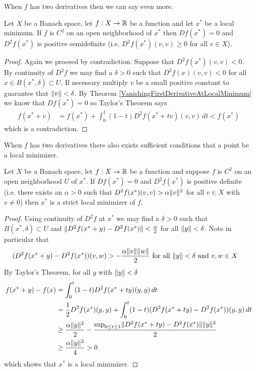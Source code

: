 When $f$ has two derivatives then we can say even more.
\begin{thm}\label{PositiveSemidefiniteSecondDerivativeAtLocalMinimum}Let $X$ be a
  Banach space, let $f : X \to \mathbb{R}$ be a function and let $x^*$ be
  a local minimum.  If $f$ is $C^2$ on an open neighborhood of $x^*$
  then $Df(x^*) = 0$ and $D^2f(x^*)$ is positive semidefinite
  (i.e. $D^2f(x^*) (v,v) \geq 0$ for all $v \in X$).
\end{thm}
\begin{proof}
Again we proceed by contradiction.  Suppose that $D^2f(x^*)(v,v) < 0$.
By continuity of $D^2f$ we may find a $\delta > 0$ such that $D^2f(x)(v,v) < 0$ for
all $x \in B(x^*,\delta) \subset U$.  If necessary multiply $v$ be a
small positive constant to guarantee that $\lVert v \rVert < \delta$.  By Theorem \ref{VanishingFirstDerivativeAtLocalMinimum} we know that
$Df(x^*) = 0$ so Taylor's Theorem says
\begin{align*}
f(x^* + v) &= f(x^*) + \int_0^1 (1 - t) D^2f(x^* + tv) (v,v) \, dt < f(x^*)
\end{align*}
which is a contradiction.
\end{proof}

When $f$ has two derivatives there also exists sufficient conditions
that a point be a local minimizer.
\begin{thm}\label{LocalMinimumAtPositiveDefiniteSecondDerivative}Let $X$ be a
  Banach space, let $f : X \to \mathbb{R}$ be a function and suppose $f$
  is $C^2$ on an open neighborhood $U$ of $x^*$.
  If $Df(x^*) = 0$ and $D^2f(x^*)$ is positive definite
  (i.e. there exists an $\alpha > 0$ such that $D^2f(x^*) (v,v) >
  \alpha \lVert v \rVert^2$ for all $v \in X$ with $v \neq 0$) then
  $x^*$ is a strict local minimizer of $f$.
\end{thm}
\begin{proof}
Using continuity of $D^2f$ at $x^*$ we may find a $\delta > 0$ such
that $B(x^*,
\delta) \subset U$ and $\lVert D^2f(x^* + y) - D^2f(x^*) \rVert
< \frac{\alpha}{2}$ for all $\lVert y \rVert < \delta$.  Note in particular
that 
\begin{align*}
(D^2f(x^* + y) - D^2f(x^*) )(v,w) &> -\frac{\alpha \lVert v \rVert
  \lVert w \rVert}{2} \text{ for all $\lVert y \rVert < \delta$ and $v,w \in X$}
\end{align*}  
By Taylor's Theorem, 
for all $y$ with $\lVert y \rVert < \delta$
\begin{align*}
f(x^* + y) - f(x) &= 
\int_0^t (1-t) D^2f(x^* + ty)(y,y) \, dt \\
&=\frac{1}{2} D^2f(x^*)(y,y) + \int_0^t (1-t) (D^2f(x^* + ty)
  -D^2f(x^*)) (y,y) \, dt  \\
&\geq \frac{\alpha \lVert y \rVert^2}{2} - \frac{\sup_{0 \leq t \leq 1}
  \lVert D^2f(x^* + ty) - D^2f(x^*) \rVert \lVert y \rVert^2}{2} \\
&\geq  \frac{\alpha
  \lVert y \rVert^2}{4} > 0\\
\end{align*}
which shows that $x^*$ is a local minimizer.
\end{proof}

